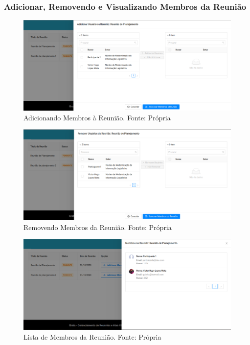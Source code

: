 \subsubsection{Adicionar, Removendo e Visualizando Membros da Reunião}

\begin{figure}[H]
    \centering
    \includegraphics[width=1.0\textwidth]{figuras/adicionando_membros_reuniao.png}
    \caption{Adicionando Membros à Reunião. Fonte: Própria}
    \label{img:adicionar_membros_a_reuniao}
\end{figure}

\begin{figure}[H]
    \centering
    \includegraphics[width=1.0\textwidth]{figuras/remover_usuarios_reuniao.png}
    \caption{Removendo Membros da Reunião. Fonte: Própria}
    \label{img:remover_membros_a_reuniao}
\end{figure}

\begin{figure}[H]
    \centering
    \includegraphics[width=1.0\textwidth]{figuras/membros_da_reuniao.png}
    \caption{Lista de Membros da Reunião. Fonte: Própria}
    \label{img:membros_da_reuniao}
\end{figure}

